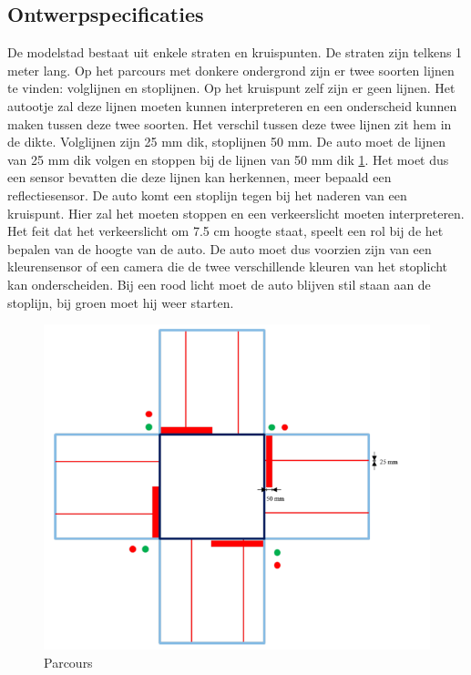 \documentclass[a4paper,twoside,kulak]{kulakreport} %
\begin{document}
\subsection{Ontwerpspecificaties} \label{Ontwerpspecificaties}


De modelstad bestaat uit enkele straten en kruispunten. De straten zijn telkens 1 meter lang. Op het parcours met donkere ondergrond zijn er twee soorten lijnen te vinden: volglijnen en stoplijnen. Op het kruispunt zelf zijn er geen lijnen. Het autootje zal deze lijnen moeten kunnen interpreteren en een onderscheid kunnen maken tussen deze twee soorten. Het verschil tussen deze twee lijnen zit hem in de dikte. Volglijnen zijn 25 mm dik, stoplijnen 50 mm. De auto moet de lijnen van 25 mm dik volgen en stoppen bij de lijnen van 50 mm dik \ref{fig:plattegrond}. Het moet dus een sensor bevatten die deze lijnen kan herkennen, meer bepaald een reflectiesensor. De auto komt een stoplijn tegen bij het naderen van een kruispunt. Hier zal het moeten stoppen en een verkeerslicht moeten interpreteren. Het feit dat het verkeerslicht om 7.5 cm hoogte staat, speelt een rol bij de het bepalen van de hoogte van de auto. De auto moet dus voorzien zijn van een kleurensensor of een camera die de twee verschillende kleuren van het stoplicht kan onderscheiden. Bij een rood licht moet de auto blijven stil staan aan de stoplijn, bij groen moet hij weer starten.

\begin{figure}
	\centering
	\includegraphics[width=.5\textwidth]{volglijnenEnStoplijnen}
	\caption{Parcours}
	\label{fig:plattegrond}
\end{figure}
\end{document}
